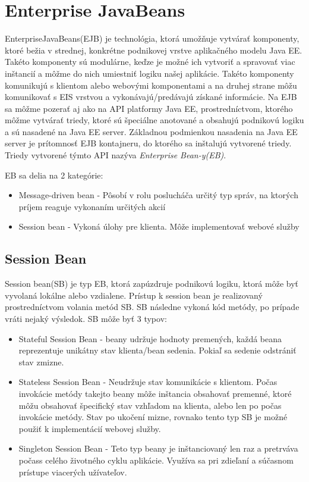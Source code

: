\section{Enterprise JavaBeans}\label{ejbkap}
EnterpriseJavaBeans(EJB) je technológia, ktorá umožňuje vytvárať komponenty, ktoré bežia v strednej, konkrétne podnikovej vrstve aplikačného modelu Java EE. Takéto komponenty sú modulárne, keďze je možné ich vytvoriť a spravovať viac inštancií a môžme do nich umiestniť logiku našej aplikácie. Takéto komponenty komunikujú s klientom alebo webovými komponentami a na druhej strane môžu komunikovať s EIS vrstvou a vykonávajú/predávajú získané informácie. Na EJB sa môžme pozerať aj ako na API platformy Java EE, prostredníctvom, ktorého môžme vytvárať triedy, ktoré sú špeciálne anotované a obsahujú podnikovú logiku a sú nasadené na Java EE server. Základnou podmienkou nasadenia na Java EE server je prítomnosť EJB kontajneru, do ktorého sa inštalujú vytvorené triedy. Triedy vytvorené týmto API nazýva \emph{Enterprise Bean-y(EB)}.

EB sa delia na 2 kategórie:
\begin{itemize}
\item Message-driven bean -  Pôsobí v rolu poslucháča  určitý typ správ, na ktorých príjem reaguje vykonaním určitých akcií
\item Session bean - Vykoná úlohy pre klienta.  Môže implementovať webové služby\cite{fitweb}

\end{itemize}


\subsection{Session Bean}
Session bean(SB) je typ EB, ktorá zapúzdruje podnikovú logiku, ktorá môže byť vyvolaná lokálne alebo vzdialene. Prístup k session bean je realizovaný prostredníctvom volania metód SB. SB následne vykoná kód metódy, po prípade vráti nejaký výsledok. \newline \indent SB môže byť 3 typov:
\begin{itemize}
\item Stateful Session Bean - beany udržuje hodnoty premených, každá beana reprezentuje unikátny stav klienta/bean sedenia. Pokiaľ sa sedenie odstrániť stav zmizne.
\item Stateless Session Bean - Neudržuje stav komunikácie s klientom. Počas invokácie metódy takejto beany môže inštancia obsahovať premenné, ktoré môžu obsahovať špecifický stav vzhľadom na klienta, alebo len po počas invokácie metódy. Stav po ukočení mizne, rovnako tento typ SB je možné použiť k implementácií webovej služby.
\item Singleton Session Bean - Teto typ beany je inštanciovaný len raz a pretrváva počass celého životného cyklu aplikácie. Využíva sa pri zdieľaní a súčasnom prístupe viacerých užívateľov.
\end{itemize}

